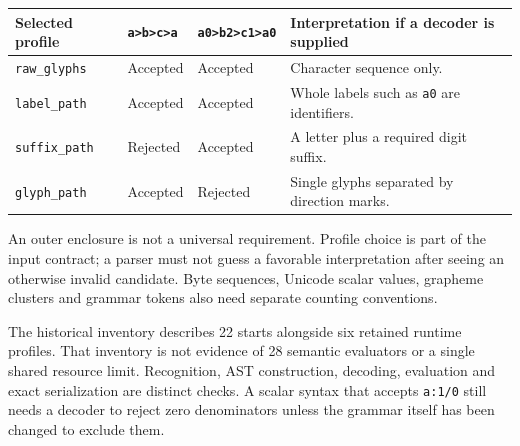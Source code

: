 \documentclass[
  11pt,
]{article}
\begin{document}
\begin{longtable}[]{@{}
  >{\raggedright\arraybackslash}p{}
  >{\raggedright\arraybackslash}p{}
  >{\raggedright\arraybackslash}p{}
  >{\raggedright\arraybackslash}p{}@{}}
\toprule\noalign{}
\begin{minipage}[b]{\linewidth}\raggedright
Selected profile
\end{minipage} & \begin{minipage}[b]{\linewidth}\raggedright
\texttt{a\textgreater{}b\textgreater{}c\textgreater{}a}
\end{minipage} & \begin{minipage}[b]{\linewidth}\raggedright
\texttt{a0\textgreater{}b2\textgreater{}c1\textgreater{}a0}
\end{minipage} & \begin{minipage}[b]{\linewidth}\raggedright
Interpretation if a decoder is supplied
\end{minipage} \\
\midrule\noalign{}
\endhead
\bottomrule\noalign{}
\endlastfoot
\nolinkurl{raw_glyphs} & Accepted & Accepted & Character sequence only. \\
\nolinkurl{label_path} & Accepted & Accepted & Whole labels such as
\nolinkurl{a0} are identifiers. \\
\nolinkurl{suffix_path} & Rejected & Accepted & A letter plus a required
digit suffix. \\
\nolinkurl{glyph_path} & Accepted & Rejected & Single glyphs separated by
direction marks. \\
\end{longtable}

An outer enclosure is not a universal requirement. Profile choice is
part of the input contract; a parser must not guess a favorable
interpretation after seeing an otherwise invalid candidate. Byte
sequences, Unicode scalar values, grapheme clusters and grammar tokens
also need separate counting conventions.

The historical inventory describes 22 starts alongside six retained
runtime profiles. That inventory is not evidence of 28 semantic
evaluators or a single shared resource limit. Recognition, AST
construction, decoding, evaluation and exact serialization are distinct
checks. A scalar syntax that accepts \texttt{a:1/0} still needs a
decoder to reject zero denominators unless the grammar itself has been
changed to exclude them.
\end{document}
